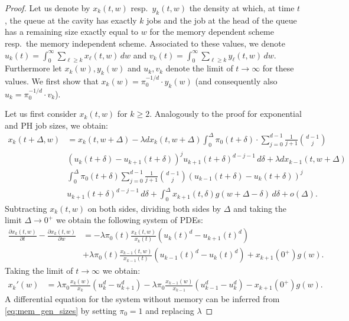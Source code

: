 \documentclass[12pt]{report}
\begin{document}
\begin{proof}
Let us denote by $x_{k}(t,w)$ resp.~$y_k(t,w)$ the density at which, at time $t$, the queue at the cavity has exactly $k$ jobs and the job at the head of the queue has a remaining size exactly equal to $w$ for the memory dependent scheme resp.~the memory independent scheme. Associated to these values, we denote $u_k(t)=\int_0^\infty \sum_{\ell \geq k} x_\ell(t,w) \, dw$ and $v_k(t) = \int_0^\infty \sum_{\ell \geq k} y_\ell (t,w) \, dw$. Furthermore let $x_{k}(w), y_{k}(w)$ and $u_{k}, v_k$ denote the limit of $t\rightarrow\infty$ for these values. We first show that $x_{k}(w)=\pi_0^{-1/d} \cdot y_{k}(w)$ (and consequently also $u_k=\pi_0^{-1/d} \cdot v_k$).

Let us first consider $x_{k}(t,w)$ for $k \geq 2$. Analogously to the proof for exponential and PH job sizes, we obtain:
\begin{align*}
x_k(t+\Delta, w)
&= x_k(t,w+\Delta) - \lambda d x_k(t,w+\Delta) \int_0^\Delta \pi_0(t+\delta) \cdot \sum_{j=0}^{d-1} \frac{1}{j+1} \binom{d-1}{j}\\
& (u_k(t+\delta)-u_{k+1}(t+\delta))^j u_{k+1}(t+\delta)^{d-j-1} \, d \delta + \lambda d x_{k-1}(t, w+\Delta)\\
& \int_0^\Delta \pi_0(t+\delta) \sum_{j=0}^{d-1} \frac{1}{j+1} \binom{d-1}{j} (u_{k-1}(t+\delta)-u_{k}(t+\delta))^j\\
& u_{k+1}(t+\delta)^{d-j-1} \, d \delta + \int_0^\Delta x_{k+1}(t,\delta) g(w+\Delta-\delta) \, d \delta + o(\Delta).
\end{align*}
Subtracting $x_k(t,w)$ on both sides, dividing both sides by $\Delta$ and taking the limit $\Delta \rightarrow 0^+$ we obtain the following system of PDEs:
\begin{align*}
\frac{\partial x_k(t,w)}{\partial t} - \frac{\partial x_k(t,w)}{\partial w}
&=-\lambda \pi_0(t) \frac{x_k(t,w)}{x_k(t)} (u_k(t)^d-u_{k+1}(t)^d)\\
& +\lambda \pi_0(t) \frac{x_{k-1}(t,w)}{x_{k-1}(t)} (u_{k-1}(t)^d - u_k(t)^d) + x_{k+1}(0^+) g(w).
\end{align*}
Taking the limit of $t\rightarrow \infty$ we obtain:
\begin{align}
x_k'(w)&=\lambda \pi_0 \frac{x_k(w)}{x_k}(u_k^d-u_{k+1}^d)-\lambda \pi_0 \frac{x_{k-1}(w)}{x_{k-1}} (u_{k-1}^d-u_k^d)  - x_{k+1} (0^+) g(w). \label{eq:mem_gen_sizes}
\end{align}
A differential equation for the system without memory can be
 inferred from \eqref{eq:mem_gen_sizes} by setting $\pi_0=1$ and replacing $\lambda$

\end{proof}
\end{document}
